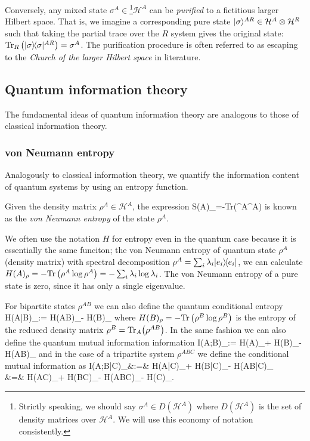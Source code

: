 \documentclass[aps,11pt,twoside,letterpaper]{article}
\def\Tr{\textup{Tr}}
\def\cH{\mathcal{H}}
\begin{document}
			Conversely, any mixed state $\sigma^A \in$\footnote{Strictly speaking, we should say 
			$\sigma^A \in D(\cH^A)$ where $D(\cH^A)$ is the set of density matrices over $\cH^A$. 
			We will use this economy of notation consistently.}$\cH^A$
			 can be \emph{purified} to a fictitious 
			larger Hilbert space. 
			That is, we imagine a corresponding pure state $\ket{\sigma}^{AR} \in \cH^A \otimes \cH^R$
			such that taking the partial trace over the $R$ system gives the original state: 
			$\Tr_R\left(\proj{\sigma}^{AR}\right)=\sigma^A$. 
			The purification procedure is often referred to as escaping to the \emph{Church of the larger
			Hilbert space} in literature.

		
	\subsection{Quantum information theory}
		The fundamental ideas of quantum information theory are analogous to those of classical information theory. 
		\subsubsection{von Neumann entropy}
		
			Analogously to classical information theory, we quantify the information content of quantum systems 
			by using an entropy function.
			
			\begin{definition} 
				Given the density matrix $\rho^A \in \cH^A$, the expression
				\be
					S(A)_\rho=-\Tr\left(\rho^A\log\rho^A\right)
				\ee
				is known as the \emph{von Neumann entropy} of the state $\rho^A$. 
			\end{definition}
		
            We often use the notation $H$ for entropy even in the quantum case because it is essentially
            the same funciton; the von Neumann entropy of quantum state $\rho^A$ (density matrix) 
            with spectral decomposition $\rho^A = \sum_i \lambda_i | e_i \rangle\!\langle e_i |$, we 
			can calculate $H(A)_\rho=-\Tr\left(\rho^A\log\rho^A\right) = - \sum_i \lambda_i \log \lambda_i$.
			The von Neumann entropy of a pure state is zero, since it has only a single eigenvalue.

			
			For bipartite states $\rho^{AB}$ we can also define the quantum conditional entropy
			\be
				H(A|B)_\rho 	:= 		H(AB)_\rho - H(B)_\rho					\label{cond-entrpy} 
			\ee
			where $H(B)_\rho = -\Tr\left(\rho^B\log\rho^B\right)$ is the entropy of the reduced density matrix
			$\rho^B = \Tr_A\!\left( \rho^{AB}\right)$. In the same fashion we can also define the 
			quantum mutual information information
			\be
				I(A;B)_\rho 	:=		H(A)_\rho + H(B)_\rho - H(AB)_\rho 
			\ee
			and in the case of a tripartite system $\rho^{ABC}$ we define the conditional mutual information 
			as 
			\bea
				I(A;B|C)_\rho 	&:=&	H(A|C)_\rho + H(B|C)_\rho - H(AB|C)_\rho \label{cond-mut-info} \\
								&=&		H(AC)_\rho + H(BC)_\rho - H(ABC)_\rho - H(C)_\rho.
			\eea
		    
\end{document}
